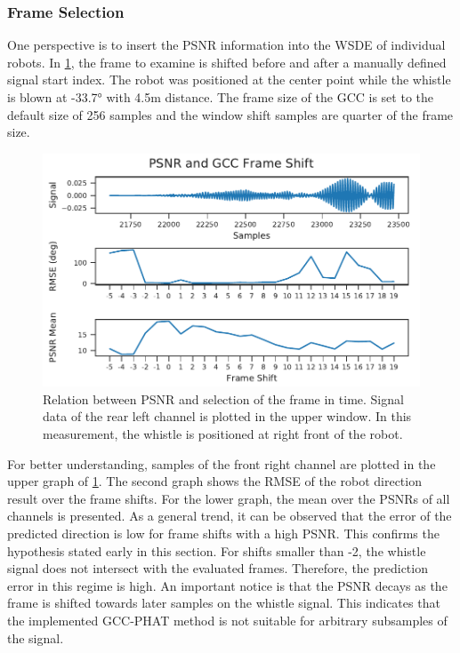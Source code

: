 \subsubsection*{Frame Selection}

One perspective is to insert the PSNR information into the \ac{WSDE} of
individual robots.
In \cref{fig:04_psnr2FrameShift}, the frame to examine is
shifted before and after a manually defined signal start index.
The robot was positioned at the center point
while the whistle is blown at -33.7\si{\degree} with 4.5\si{\meter}
distance.
The frame size of the \ac{GCC} is set to the default size of 256 samples and
the window shift samples are quarter of the frame size.
\begin{figure}[h]
	\centering
	\includegraphics[]{figures/evaluation/gcc_frame_shift}
	\caption{
		Relation between \ac{PSNR}
		and selection of the frame in time. Signal data
		of the rear left channel is plotted in the upper window.
		In this measurement, the whistle is positioned at right front
		of the robot.
	}
	\label{fig:04_psnr2FrameShift}
\end{figure}
For better understanding, samples of the front right channel are plotted
in the upper graph of \cref{fig:04_psnr2FrameShift}.
The second graph shows the \ac{RMSE} of the robot direction result
over the frame shifts.
For the lower graph, the mean over the \acp{PSNR} of all channels
is presented.
As a general trend, it can be observed that the error of the predicted
direction is low for frame shifts with a high \ac{PSNR}.
This confirms the hypothesis stated early in this section.
For shifts smaller than -2, the whistle signal does not intersect with the
evaluated frames.
Therefore, the prediction error in this regime is high.
An important notice is that the \ac{PSNR} decays as the frame is shifted towards
later samples on the whistle signal. This indicates that the implemented
\ac{GCC-PHAT} method is not suitable for arbitrary subsamples of the signal.

